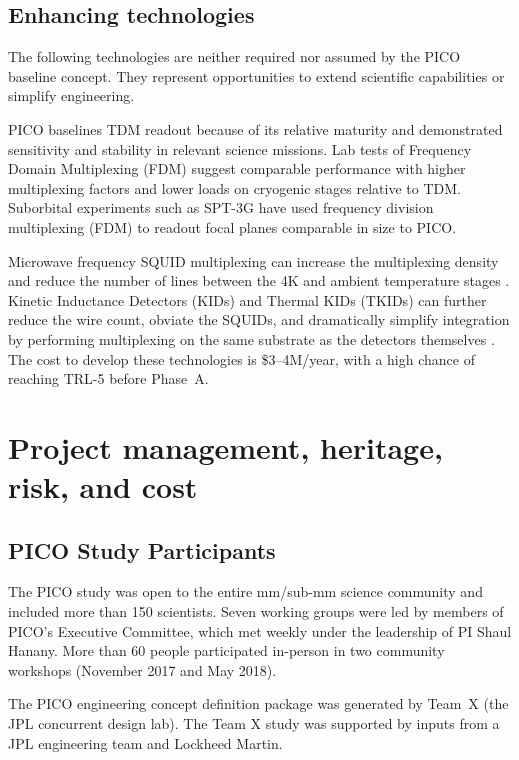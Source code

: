\subsection{Enhancing technologies}
\label{sec:enhancing_technologies} %

The following technologies are neither required nor assumed by the
PICO baseline concept. They represent opportunities to extend
scientific capabilities or simplify engineering.

PICO baselines TDM readout because of its relative maturity and
demonstrated sensitivity and stability in relevant science
missions. Lab tests of Frequency Domain Multiplexing (FDM) suggest
comparable performance with higher multiplexing factors and lower
loads on cryogenic stages relative to TDM. Suborbital experiments such
as SPT-3G have used frequency division multiplexing (FDM) to readout
focal planes comparable in size to PICO.

Microwave frequency SQUID multiplexing can increase the multiplexing
density and reduce the number of lines between the 4K and ambient
temperature stages \citep{Dober2017,Irwin2004}. Kinetic Inductance
Detectors (KIDs) and Thermal KIDs (TKIDs) can further reduce the wire
count, obviate the SQUIDs, and dramatically simplify integration by
performing multiplexing on the same substrate as the detectors
themselves \citep{McCarrick2016,Steinbach2018}. The cost to develop
these technologies is \$3--4M/year, with a high chance of reaching
TRL-5 before Phase~A.
\costfootnote

\newpage
\section{Project management, heritage, risk, and cost}
\label{sec:project_management} %

\subsection{PICO Study Participants}
\label{sec:study_participants} %

The PICO study was open to the entire mm/sub-mm science community and
included more than 150 scientists. Seven working groups were led by
members of PICO's Executive Committee, which met weekly under the
leadership of PI Shaul Hanany. More than 60 people participated
in-person in two community workshops (November 2017 and May 2018).

The PICO engineering concept definition package was generated by
Team~X (the JPL concurrent design lab). The Team X study was supported
by inputs from a JPL engineering team and Lockheed Martin.

